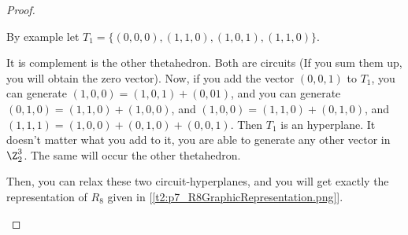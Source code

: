 \begin{proof}
\begin{enumerate}[label=(\roman*)]
            By example let $T_1 = \{(0, 0, 0), (1, 1, 0), (1, 0, 1), (1, 1, 0)\}$.\pn
            
            It is complement is the other thetahedron. Both are circuits (If you sum them up, you will obtain
            the zero vector). Now, if you add the vector $(0, 0, 1)$ to $T_1$, you can generate $(1, 0, 0) = (1, 0, 1) + (0, 0 1)$,
            and you can generate $(0, 1, 0) = (1, 1, 0) + (1, 0, 0)$, and $(1, 0, 0) = (1, 1, 0) + (0, 1, 0)$, and
            $(1, 1, 1) = (1, 0, 0) + (0, 1, 0) + (0, 0, 1)$. Then $T_1$ is an hyperplane. It doesn't matter what you
            add to it, you are able to generate any other vector in $\Z_2^3$. The same will occur the other thetahedron.\pn
            
            Then, you can relax these two circuit-hyperplanes, and you will get exactly the representation of $R_8$ given in
            [\ref{t2:p7_R8GraphicRepresentation.png}].
    \end{enumerate}
\end{proof}